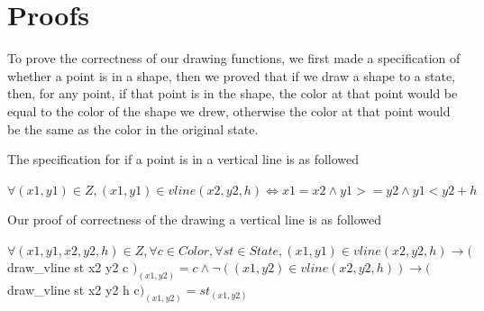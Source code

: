 \documentclass{llncs}
\begin{document}
 
















\section{Proofs}
To prove the correctness of our drawing functions, we first made a specification of whether a point is in a shape, then we proved that if we draw a shape to a state, then, for any point, if that point is in the shape, the color at that point would be equal to the color of the shape we drew, otherwise the color at that point would be the same as the color in the original state.

The specification for if a point is in a vertical line is as followed

\begin {definition} [on\_vline]
$\forall (x1,y1) \in Z, (x1,y1) \in vline (x2,y2,h) \iff x1 = x2 \land y1 >= y2 \land y1 < y2 + h$
\end {definition}

Our proof of correctness of the drawing a vertical line is as followed

\begin {theorem} 
$\forall (x1,y1,x2,y2,h) \in Z, \forall c \in Color,\forall st \in State, (x1,y1) \in vline (x2,y2,h) \rightarrow ($ draw\_vline st x2 y2 c $)_{(x1,y2)} = c \land \neg ((x1,y2) \in vline (x2,y2,h)) \rightarrow ($draw\_vline st x2 y2 h c$)_{(x1,y2)} = st_{(x1,y2)} $
\end {theorem}
\end{document}

